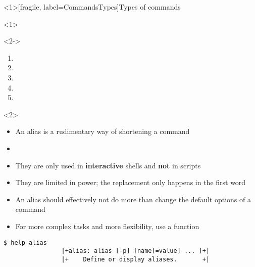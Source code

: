 \begin{frame}<1>[fragile, label=CommandsTypes]{Types of commands}
    \begin{onlyenv}<1>
        \begin{center}
        \end{center}
    \end{onlyenv}
    \vspace{-6mm}
    \begin{onlyenv}<2->
        \setlength{\columnsep}{-5mm}
        \begin{multicols}{5}
            \begin{enumerate}
                \item {}
                \item {}
                \item {}
                \item {}
                \item {}
            \end{enumerate}
        \end{multicols}
    \end{onlyenv}
    \vspace{-3mm}
    \begin{overlayarea}{\textwidth}{0.7\textheight}
        \begin{onlyenv}<2>
            \begin{itemize}
                \item An alias is a rudimentary way of shortening a command
                \item {}
                \item They are only used in \textbf{interactive} shells and \textbf{not} in scripts
                \item They are limited in power; the replacement only happens in the first word
                \item An alias should effectively not do more than change the default options of a command
                \item For more complex tasks and more flexibility, use a function
            \end{itemize}
            \begin{lstlisting}[style=MyBash]
                $ help alias
                |+alias: alias [-p] [name[=value] ... ]+|
                |+    Define or display aliases.       +|


\end{lstlisting}
\end{onlyenv}
\end{overlayarea}
\end{frame}
